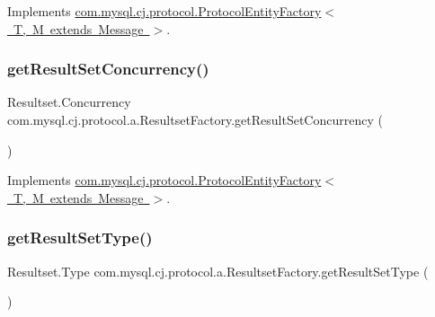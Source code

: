 Implements \mbox{\hyperlink{interfacecom_1_1mysql_1_1cj_1_1protocol_1_1_protocol_entity_factory_a282b14fecc86c7202cd9361333235ef8}{com.\+mysql.\+cj.\+protocol.\+Protocol\+Entity\+Factory$<$ T, M extends Message $>$}}.

\mbox{\label{classcom_1_1mysql_1_1cj_1_1protocol_1_1a_1_1_resultset_factory_add802e01666fd1a41db44894232f912d}} 
\subsubsection{\texorpdfstring{get\+Result\+Set\+Concurrency()}{getResultSetConcurrency()}}
{\footnotesize\ttfamily Resultset.\+Concurrency com.\+mysql.\+cj.\+protocol.\+a.\+Resultset\+Factory.\+get\+Result\+Set\+Concurrency (\begin{DoxyParamCaption}{ }\end{DoxyParamCaption})}



Implements \mbox{\hyperlink{interfacecom_1_1mysql_1_1cj_1_1protocol_1_1_protocol_entity_factory_ab5bf153eafa066fe2d98fd6bd8372972}{com.\+mysql.\+cj.\+protocol.\+Protocol\+Entity\+Factory$<$ T, M extends Message $>$}}.

\mbox{\label{classcom_1_1mysql_1_1cj_1_1protocol_1_1a_1_1_resultset_factory_a22c757bc4f5d57428ad2d34ee330cd66}} 
\subsubsection{\texorpdfstring{get\+Result\+Set\+Type()}{getResultSetType()}}
{\footnotesize\ttfamily Resultset.\+Type com.\+mysql.\+cj.\+protocol.\+a.\+Resultset\+Factory.\+get\+Result\+Set\+Type (\begin{DoxyParamCaption}{ }\end{DoxyParamCaption})}



